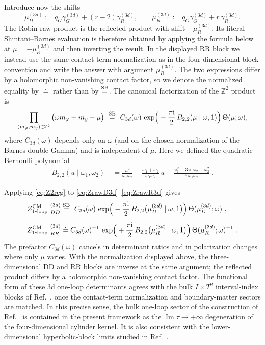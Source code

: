 \documentclass[11pt,a4paper]{article}
\numberwithin{equation}{section}
\theoremstyle{plain}
\theoremstyle{definition}
\theoremstyle{remark}
\newcommand{\ii}{\mathrm{i}}
\begin{document}
Introduce now the shifts
\begin{equation}
\mu^{(3d)}_{D}:=q_G\gamma_G^{(3d)}+(r-2)\gamma_R^{(3d)},
\qquad
\mu^{(3d)}_{R}:=q_G\gamma_G^{(3d)}+r\,\gamma_R^{(3d)}.
\label{eq:mu3d}
\end{equation}
The Robin raw product is the reflected product with shift \(-\mu_R^{(3d)}\).  Its literal Shintani--Barnes evaluation is therefore obtained by applying the formula below at \(\mu=-\mu_R^{(3d)}\) and then inverting the result.  In the displayed RR block we instead use the same contact-term normalization as in the four-dimensional block convention and write the answer with argument \(\mu_R^{(3d)}\).  The two expressions differ by a holomorphic non-vanishing contact factor, so we denote the normalized equality by \(\doteq\) rather than by \(\stackrel{\rm SB}{=}\).  The canonical factorization of the $\mathbb{Z}^2$ product is
\begin{equation}
\prod_{(m_\varphi,m_y)\in\mathbb{Z}^2}\big(\omega m_\varphi+m_y-\mu\big)
\ \stackrel{\rm SB}{=}\
C_{3d}(\omega)\,
\exp\!\Big(-\frac{\pi \ii}{2}\,B_{2,2}(\mu\mid\omega,1)\Big)\,
\Theta(\mu;\omega),
\label{eq:Z2reg}
\end{equation}
where $C_{3d}(\omega)$ depends only on $\omega$ (and on the chosen normalization of the Barnes double Gamma) and is independent of $\mu$. Here we defined the quadratic Bernoulli polynomial
\begin{align}
B_{2,2}(u\mid\omega_1,\omega_2) & \ 
=
\frac{u^2}{\omega_1\omega_2}
-\frac{\omega_1+\omega_2}{\omega_1\omega_2}\,u
+\frac{\omega_1^2+3\omega_1\omega_2+\omega_2^2}{6\,\omega_1\omega_2}~.
\label{eq:B22explicit}
\end{align}

Applying \eqref{eq:Z2reg} to \eqref{eq:ZrawD3d}--\eqref{eq:ZrawR3d} gives
\begin{align}
Z^{\mathrm{CM}}_{\mathrm{1\mbox{-}loop}}\big|_{DD}^{(3d)}
&\stackrel{\rm SB}{=}\
C_{3d}(\omega)\,
\exp\!\Big(-\frac{\pi \ii}{2}\,B_{2,2}\big(\mu^{(3d)}_{D}\mid\omega,1\big)\Big)\,
\Theta( \mu^{(3d)}_{D};\omega)~,
\label{eq:Z3dDDreg}\\[2mm]
Z^{\mathrm{CM}}_{\mathrm{1\mbox{-}loop}}\big|_{RR}^{(3d)}
&\doteq
C_{3d}(\omega)^{-1}\,
\exp\!\Big(+\frac{\pi \ii}{2}\,B_{2,2}\big(\mu^{(3d)}_{R}\mid\omega,1\big)\Big)\,
\Theta(\mu^{(3d)}_{R};\omega)^{-1}~.
\label{eq:Z3dRRreg}
\end{align}
The prefactor $C_{3d}(\omega)$ cancels in determinant ratios and in polarization changes where only $\mu$ varies.  With the normalization displayed above, the three-dimensional DD and RR blocks are inverse at the same argument; the reflected product differs by a holomorphic non-vanishing contact factor.  The functional form of these 3d one-loop determinants agrees with the bulk $I\times T^2$ interval-index blocks of Ref.~\cite{Sugiyama:2020uqh}, once the contact-term normalization and boundary-matter sectors are matched.  In this precise sense, the bulk one-loop sector of the construction of Ref.~\cite{Sugiyama:2020uqh} is contained in the present framework as the $\operatorname{Im}\tau\to+\infty$ degeneration of the four-dimensional cylinder kernel.  It is also consistent with the lower-dimensional hyperbolic-block limits studied in Ref.~\cite{Pittelli:2018rpl}.
\end{document}
